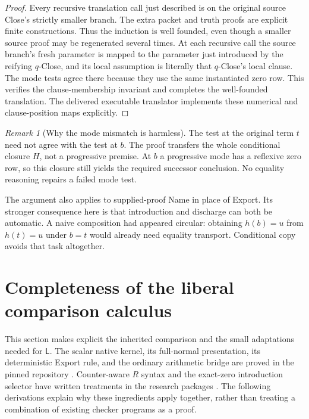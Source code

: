 \documentclass[11pt,letterpaper]{article}
\theoremstyle{definition}\newtheorem{definition}[theorem]{Definition}
\theoremstyle{remark}\newtheorem{remark}[theorem]{Remark}
\newcommand{\Liberal}{\mathsf L}
\begin{document}
\begin{proof}
Every recursive translation call just described is on the original
source Close's strictly smaller branch. The extra packet and truth
proofs are explicit finite constructions. Thus the induction is
well founded, even though a smaller source proof may be regenerated
several times. At each recursive call the source branch's fresh parameter
is mapped to the parameter just introduced by the reifying $q$-Close,
and its local assumption is literally that $q$-Close's local clause.
The mode tests agree there because they use the same instantiated zero
row. This verifies the clause-membership invariant and completes the
well-founded translation. The delivered executable translator implements
these numerical and clause-position maps explicitly.
\end{proof}

\begin{remark}[Why the mode mismatch is harmless]
The test at the original term $t$ need not agree with the test at $b$.
The proof transfers the whole conditional closure $H$, not a progressive
premise. At $b$ a progressive mode has a reflexive zero row, so this
closure still yields the required successor conclusion. No equality
reasoning repairs a failed mode test.
\end{remark}

The argument also applies to supplied-proof Name in place of Export.
Its stronger consequence here is that introduction and discharge can
both be automatic. A naive composition had appeared circular: obtaining
$h(b)=u$ from $h(t)=u$ under $b=t$ would already need equality transport.
Conditional copy avoids that task altogether.

\section{Completeness of the liberal comparison calculus}\label{sec:liberal}
This section makes explicit the inherited comparison and the small
adaptations needed for $\Liberal$. The scalar native kernel, its
full-normal presentation, its deterministic Export rule, and the
ordinary arithmetic bridge are proved in the pinned repository
\cite{repo,lean,export}. Counter-aware $R$ syntax and the exact-zero
introduction selector have written treatments in the research packages
\cite{uniform,parameter,rootfree}. The following derivations explain
why these ingredients apply together, rather than treating a combination
of existing checker programs as a proof.
\end{document}
